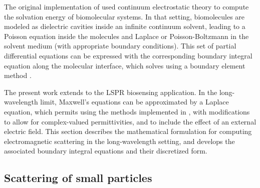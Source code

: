 
The original implementation of \pygbe used continuum electrostatic theory to compute
the solvation energy of biomolecular systems. In that setting, biomolecules are modeled as 
dielectric cavities inside an infinite continuum solvent, 
leading to a Poisson equation inside the molecules and Laplace or Poisson-Boltzmann in the solvent medium (with appropriate boundary conditions).
This set of partial differential equations can be 
expressed with the corresponding boundary integral equation along the molecular interface, 
which \pygbe solves using a boundary element method \cite{CooperBardhanBarba2013,CooperClementiBarba2015}.

The present work extends \pygbe to the LSPR biosensing application. 
In the long-wavelength limit, Maxwell's equations can be approximated by a Laplace equation,
which permits using the methods implemented in \pygbe, with modifications
to allow for complex-valued permittivities, and to include the
effect of an external electric field.
This section describes the mathematical formulation for computing electromagnetic scattering 
in the long-wavelength setting, and develops the associated boundary integral equations 
and their discretized form.

\subsection{Scattering of small particles} \label{sec:scattering_small}


